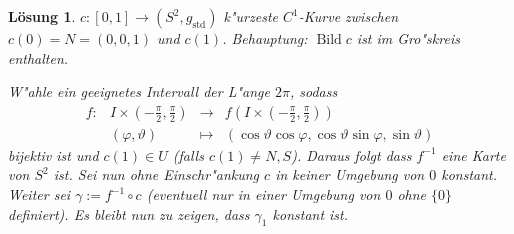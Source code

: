 \documentclass[paper=A4, twoside, chapterprefix=true, bibliography=totoc, headsepline]{scrbook}
\let\temp\phi{}
\let\phi\varphi{}
\let\varphi\temp{}
\let\temp\theta{}
\let\theta\vartheta{}
\let\vartheta\temp{}
\let\temp\epsilon{}
\let\epsilon\varepsilon{}
\let\varepsilon\temp{}
\let\temp\rho{}
\let\rho\varrho{}
\let\varrho\temp{}
\DeclareMathOperator{\Bild}{Bild}
\newcommand{\X}{\times}
\theoremstyle{plain}
\theoremstyle{nonumberplain}
\theoremstyle{empty}
\theoremstyle{break}
\newtheorem{Loes}{L\"osung}
\begin{document}
\begin{Loes}
$c: [0,1] \to (S^2, g_{\text{std}})$ k"urzeste $C^1$-Kurve zwischen $c(0) = N = (0,0,1)$ und $c(1)$. \emph{Behauptung:} $\Bild c$ ist im Gro"skreis enthalten.

W"ahle ein geeignetes Intervall der L"ange $2 \pi$, sodass
	\[\begin{array}{cccc} f: & I \X \left( -\frac{\pi}{2}, \frac{\pi}{2} \right) &\to& f \left( I \X \left( -\frac{\pi}{2}, \frac{\pi}{2} \right) \right)\\
		& (\phi, \theta) &\mapsto& (\cos\theta \cos\phi, \cos\theta\sin\phi, \sin\theta)\end{array}\]
bijektiv ist und $c(1) \in U$ (falls $c(1) \ne N,S$). Daraus folgt dass $f^{-1}$ eine Karte von $S^2$ ist. Sei nun ohne Einschr"ankung $c$ in keiner Umgebung von $0$ konstant. Weiter sei $\gamma := f^{-1} \circ c$ (eventuell nur in einer Umgebung von $0$ ohne $\{0\}$ definiert). Es bleibt nun zu zeigen, dass $\gamma_1$ konstant ist.


\end{Loes}
\end{document}
